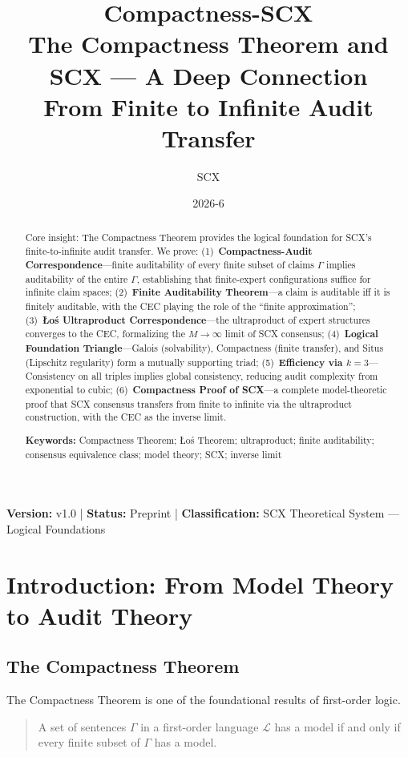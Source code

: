 \documentclass[12pt,a4paper]{article}
\title{\textbf{Compactness-SCX}\\[4pt]
\large The Compactness Theorem and SCX --- A Deep Connection\\[2pt]
\small From Finite to Infinite Audit Transfer}
\author{SCX}
\date{2026-6}
\theoremstyle{remark}
\newcommand{\Lang}{\mathcal{L}}
\begin{document}
\maketitle
\begin{center}
\footnotesize
\textbf{Version: } v1.0 \quad | \quad
\textbf{Status:} Preprint \quad | \quad
\textbf{Classification:} SCX Theoretical System --- Logical Foundations
\end{center}
\begin{abstract}
Core insight: The Compactness Theorem provides the logical foundation for SCX's finite-to-infinite audit transfer. We prove: (1)~\textbf{Compactness-Audit Correspondence}---finite auditability of every finite subset of claims \(\Gamma\) implies auditability of the entire \(\Gamma\), establishing that finite-expert configurations suffice for infinite claim spaces; (2)~\textbf{Finite Auditability Theorem}---a claim is auditable iff it is finitely auditable, with the CEC playing the role of the ``finite approximation''; (3)~\textbf{Łoś Ultraproduct Correspondence}---the ultraproduct of expert structures converges to the CEC, formalizing the \(M\to\infty\) limit of SCX consensus; (4)~\textbf{Logical Foundation Triangle}---Galois (solvability), Compactness (finite transfer), and Situs (Lipschitz regularity) form a mutually supporting triad; (5)~\textbf{Efficiency via \(k=3\)}---Consistency on all triples implies global consistency, reducing audit complexity from exponential to cubic; (6)~\textbf{Compactness Proof of SCX}---a complete model-theoretic proof that SCX consensus transfers from finite to infinite via the ultraproduct construction, with the CEC as the inverse limit.

\textbf{Keywords:} Compactness Theorem; Łoś Theorem; ultraproduct; finite auditability; consensus equivalence class; model theory; SCX; inverse limit
\end{abstract}
\tableofcontents
\newpage
\section{Introduction: From Model Theory to Audit Theory}
\subsection{The Compactness Theorem}
The Compactness Theorem is one of the foundational results of first-order logic.
\begin{quote}
A set of sentences \(\Gamma\) in a first-order language \(\Lang\) has a model if and only if every finite subset of \(\Gamma\) has a model.
\end{quote}
\end{document}
